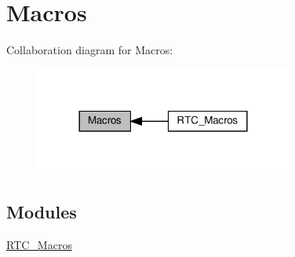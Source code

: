 \hypertarget{group___project}{}\section{Macros}
\label{group___project}
Collaboration diagram for Macros\+:\nopagebreak
\begin{figure}[H]
\begin{center}
\leavevmode
\includegraphics[width=240pt]{group___project}
\end{center}
\end{figure}
\subsection*{Modules}
\begin{DoxyCompactItemize}
\item 
\hyperlink{group___r_t_c___macros}{R\+T\+C\+\_\+\+Macros}
\end{DoxyCompactItemize}
